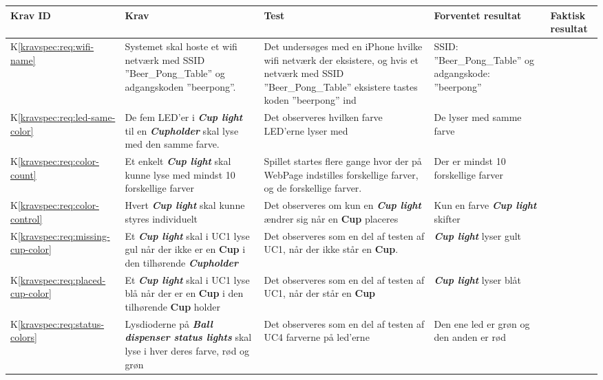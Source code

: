 \documentclass[Accepttestspecifikation/Accepttest_Main.tex]{subfiles}
\begin{document}
\begin{longtable}{|L{0.08\textwidth}|L{0.3\textwidth}|L{0.3\textwidth}|L{0.2\textwidth}|L{0.2\textwidth}|}
\hline
\textbf{Krav ID} & \textbf{Krav} & \textbf{Test} & \textbf{Forventet resultat} & \textbf{Faktisk resultat} \\ \hline

K\ref{kravspec:req:wifi-name}& Systemet skal hoste et wifi netværk med SSID ''Beer\_Pong\_Table'' og adgangskoden ''beerpong''. & Det undersøges med en  iPhone hvilke wifi netværk der eksistere, og hvis et netværk med SSID ''Beer\_Pong\_Table'' eksistere tastes koden ''beerpong'' ind & SSID: ''Beer\_Pong\_Table'' og adgangskode: ''beerpong'' & \\ \hline
K\ref{kravspec:req:led-same-color} & De fem LED'er i \textit{\textbf{Cup light}} til en \textit{\textbf{Cupholder}} skal lyse med den samme farve. & Det observeres hvilken farve LED'erne lyser med & De lyser med samme farve & \\ \hline
K\ref{kravspec:req:color-count} & Et enkelt \textit{\textbf{Cup light}} skal kunne lyse med mindst 10 forskellige farver & Spillet startes flere gange hvor der på WebPage indstilles forskellige farver, og de forskellige farver. & Der er mindst 10 forskellige farver & \\ \hline
K\ref{kravspec:req:color-control} & Hvert \textit{\textbf{Cup light}} skal kunne styres individuelt & Det observeres om kun en \textit{\textbf{Cup light}} ændrer sig når en \textbf{Cup} placeres & Kun en farve \textbf{\textit{Cup light}} skifter & \\ \hline 
K\ref{kravspec:req:missing-cup-color} & Et \textit{\textbf{Cup light}} skal i UC1 lyse gul når der ikke er en \textbf{Cup} i den tilhørende \textit{\textbf{Cupholder}}  & Det observeres som en del af testen af UC1, når der ikke står en \textbf{Cup}.& \textbf{\textit{Cup light}} lyser gult & \\ \hline
K\ref{kravspec:req:placed-cup-color} & Et \textit{\textbf{Cup light}} skal i UC1 lyse blå når der er en \textbf{Cup} i den tilhørende \textbf{Cup} holder & Det observeres som en del af testen af UC1, når der står en \textbf{Cup} & \textbf{\textit{Cup light}} lyser blåt & \\ \hline
K\ref{kravspec:req:status-colors} & Lysdioderne på \textit{\textbf{Ball dispenser status lights}} skal lyse i hver deres farve, rød og grøn & Det observeres som en del af testen af UC4 farverne på led'erne & Den ene led er grøn og den anden er rød &  \\ \hline

\end{longtable}
\end{document}

